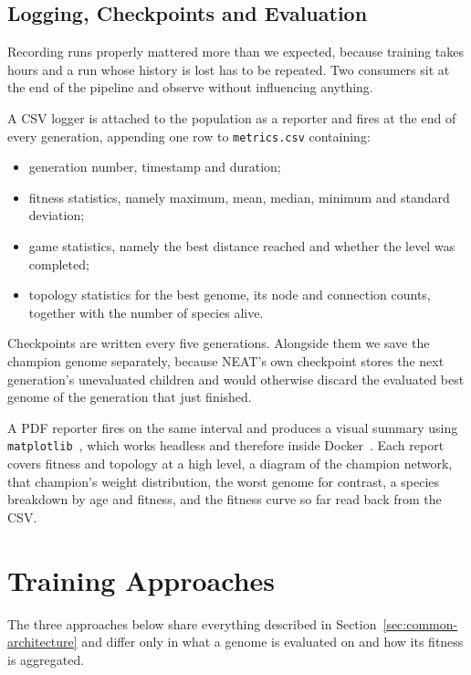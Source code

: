 \subsection{Logging, Checkpoints and Evaluation}
\label{subsec:logging-reporting}

Recording runs properly mattered more than we expected, because training takes
hours and a run whose history is lost has to be repeated. Two consumers sit at
the end of the pipeline and observe without influencing anything.

\noindent
A CSV logger is attached to the population as a reporter and fires at the end
of every generation, appending one row to \texttt{metrics.csv} containing:

\begin{itemize}
    \item generation number, timestamp and duration;
    \item fitness statistics, namely maximum, mean, median, minimum and
    standard deviation;
    \item game statistics, namely the best distance reached and whether the
    level was completed;
    \item topology statistics for the best genome, its node and connection
    counts, together with the number of species alive.
\end{itemize}

\noindent
Checkpoints are written every five generations. Alongside them we save the
champion genome separately, because NEAT's own checkpoint stores the next
generation's unevaluated children and would otherwise discard the evaluated
best genome of the generation that just finished.

\noindent
A PDF reporter fires on the same interval and produces a visual summary using
\texttt{matplotlib}~\cite{hunter2007}, which works headless and therefore inside
Docker~\cite{merkel2014}. Each
report covers fitness and topology at a high level, a diagram of the champion
network, that champion's weight distribution, the worst genome for contrast, a
species breakdown by age and fitness, and the fitness curve so far read back
from the CSV.

\section{Training Approaches}
\label{sec:training-approaches}

The three approaches below share everything described in
Section~\ref{sec:common-architecture} and differ only in what a genome is
evaluated on and how its fitness is aggregated.


